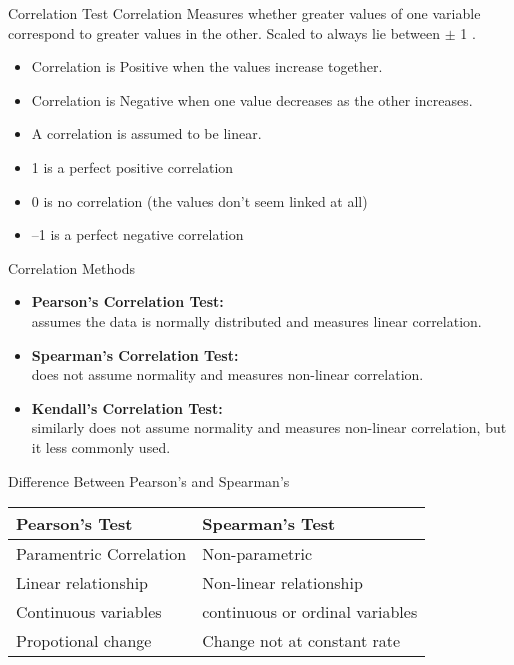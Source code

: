 \begin{frame}[t]{Correlation Test}
	Correlation Measures whether greater values of one variable correspond to greater values in the other. Scaled to always lie between $\pm$ 1 .
	\begin{itemize}
		\item Correlation is Positive when the values increase together.
		\item Correlation is Negative when one value decreases as the other increases.
		\item A correlation is assumed to be linear.
		\item 1 is a perfect positive correlation
		\item 0 is no correlation (the values don’t seem linked at all)
		\item --1 is a perfect negative correlation
	\end{itemize}
\end{frame}
\begin{frame}[t]{Correlation Methods}
	\begin{itemize}
		\item \textbf{Pearson's Correlation Test:} \\ assumes the data is normally distributed and measures linear correlation.
		\item \textbf{Spearman's Correlation Test:} \\ does not assume normality and measures non-linear correlation.
		\item \textbf{Kendall's Correlation Test:} \\ similarly does not assume normality and measures non-linear correlation, but it less commonly used.
		
	\end{itemize}
\end{frame}
\begin{frame}[t]{Difference Between Pearson's and Spearman's}
	\begin{tabular}{ l l }
		\textbf{Pearson's Test} & \textbf{Spearman's Test}  \\
		\hline
		Paramentric Correlation & Non-parametric \\
		Linear relationship & Non-linear relationship \\
		Continuous variables & continuous or ordinal variables \\
		Propotional change & Change not at constant rate
		
	\end{tabular}
\end{frame}

